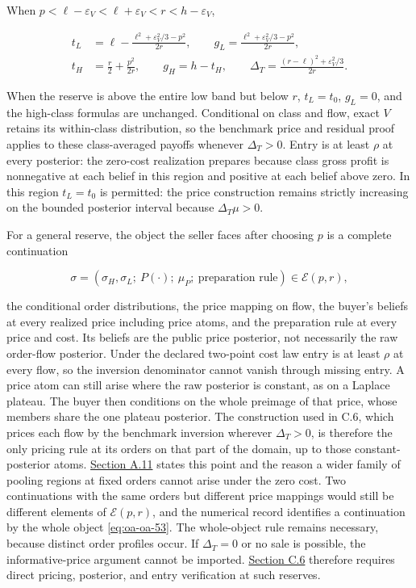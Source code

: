 \documentclass[
  11pt,
]{article}
\begin{document}
When \(p<\ell-\varepsilon_V<\ell+\varepsilon_V<r<h-\varepsilon_V\),

\[
\begin{aligned}
t_L&=\ell-\frac{\ell^2+\varepsilon_V^2/3-p^2}{2r},\qquad
g_L=\frac{\ell^2+\varepsilon_V^2/3-p^2}{2r},\\
t_H&=\frac r2+\frac{p^2}{2r},\qquad g_H=h-t_H,\qquad
\Delta_T=\frac{(r-\ell)^2+\varepsilon_V^2/3}{2r}.
\end{aligned}
\tag{OA.52}\label{eq:oa-oa-52}
\]

When the reserve is above the entire low band but below \(r\),
\(t_L=t_0\), \(g_L=0\), and the high-class formulas are unchanged.
Conditional on class and flow, exact \(V\) retains its within-class
distribution, so the benchmark price and residual proof applies to these
class-averaged payoffs whenever \(\Delta_T>0\). Entry is at least
\(\rho\) at every posterior: the zero-cost realization prepares because
class gross profit is nonnegative at each belief in this region and
positive at each belief above zero. In this region \(t_L=t_0\) is permitted: the price
construction remains strictly increasing on the bounded posterior
interval because \(\Delta_T\mu>0\).

For a general reserve, the object the seller faces after choosing \(p\)
is a complete continuation

\[
\sigma=(\sigma_H,\sigma_L;\ P(\cdot);\ \mu_P;\ \text{preparation rule})\in\mathcal E(p,r),
\tag{OA.53}\label{eq:oa-oa-53}
\]

the conditional order distributions, the price mapping on flow, the
buyer's beliefs at every realized price including price atoms, and the
preparation rule at every price and cost. Its beliefs are the public
price posterior, not necessarily the raw order-flow posterior. Under the
declared two-point cost law entry is at least \(\rho\) at every flow, so
the inversion denominator cannot vanish through missing entry. A price
atom can still arise where the raw posterior is constant, as on a Laplace
plateau. The buyer then conditions on the whole preimage of that price,
whose members share the one plateau posterior. The construction used in C.6,
which prices each flow by the benchmark inversion wherever
\(\Delta_T>0\), is therefore the only pricing rule at its orders on that
part of the domain, up to those constant-posterior atoms.
\hyperref[oa-a-pools]{Section A.11} states this point and the reason a wider
family of pooling regions at fixed orders cannot arise under the zero cost.
Two continuations with the same orders but different price mappings would
still be different elements of
\(\mathcal E(p,r)\), and the numerical record identifies a continuation
by the whole object \eqref{eq:oa-oa-53}. The whole-object rule remains necessary,
because distinct order profiles occur. If \(\Delta_T=0\) or no sale is possible, the informative-price argument cannot be imported.
\hyperref[oa-c-reserve]{Section C.6} therefore requires direct pricing,
posterior, and entry verification at such reserves.
\end{document}

